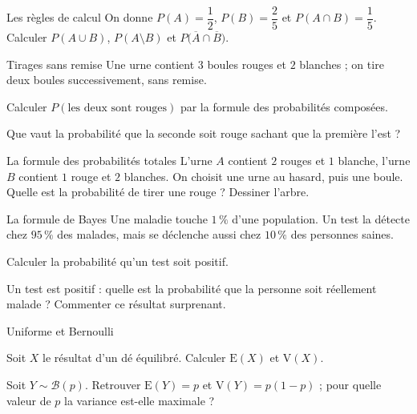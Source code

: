 \begin{exercice}[1]{Les règles de calcul}
On donne $P(A)=\dfrac12$, $P(B)=\dfrac25$ et $P(A\cap B)=\dfrac15$.
Calculer $P(A\cup B)$, $P(A\setminus B)$ et
$P\bigl(\overline A\cap\overline B\bigr)$.
\end{exercice}

\begin{exercice}[1]{Tirages sans remise}
Une urne contient $3$ boules rouges et $2$ blanches ; on tire deux boules
successivement, sans remise.
\begin{questions}
  \item Calculer $P(\text{les deux sont rouges})$ par la formule des
    probabilités composées.
  \item Que vaut la probabilité que la seconde soit rouge sachant que la
    première l'est ?
\end{questions}
\end{exercice}

\begin{exercice}[1]{La formule des probabilités totales}
L'urne $A$ contient $2$ rouges et $1$ blanche, l'urne $B$ contient $1$
rouge et $2$ blanches. On choisit une urne au hasard, puis une boule.
Quelle est la probabilité de tirer une rouge ? Dessiner l'arbre.
\end{exercice}

\begin{exercice}[1]{La formule de Bayes}
Une maladie touche $1\,\%$ d'une population. Un test la détecte chez
$95\,\%$ des malades, mais se déclenche aussi chez $10\,\%$ des personnes
saines.
\begin{questions}
  \item Calculer la probabilité qu'un test soit positif.
  \item Un test est positif : quelle est la probabilité que la personne
    soit réellement malade ? Commenter ce résultat surprenant.
\end{questions}
\end{exercice}

\begin{exercice}[1]{Uniforme et Bernoulli}
\begin{questions}
  \item Soit $X$ le résultat d'un dé équilibré. Calculer
    $\mathrm{E}(X)$ et $\mathrm{V}(X)$.
  \item Soit $Y\sim\mathcal{B}(p)$. Retrouver $\mathrm{E}(Y)=p$ et
    $\mathrm{V}(Y)=p(1-p)$ ; pour quelle valeur de $p$ la variance
    est-elle maximale ?
\end{questions}
\end{exercice}

